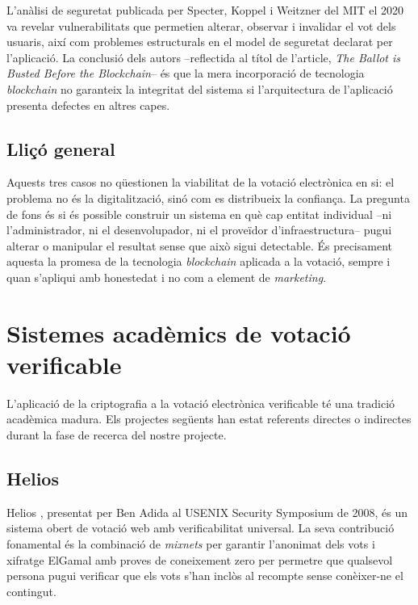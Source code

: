 L'anàlisi de seguretat publicada per Specter, Koppel i Weitzner del
MIT el 2020 \cite{specter2020voatz} va revelar vulnerabilitats que
permetien alterar, observar i invalidar el vot dels usuaris, així com
problemes estructurals en el model de seguretat declarat per
l'aplicació. La conclusió dels autors --reflectida al títol de l'article,
\emph{The Ballot is Busted Before the Blockchain}-- és que la mera
incorporació de tecnologia \emph{blockchain} no garanteix la integritat
del sistema si l'arquitectura de l'aplicació presenta defectes en
altres capes.

\subsection{Lliçó general}

Aquests tres casos no qüestionen la viabilitat de la votació
electrònica en si: el problema no és la digitalització, sinó com es
distribueix la confiança. La pregunta de fons és si és possible
construir un sistema en què cap entitat individual --ni l'administrador,
ni el desenvolupador, ni el proveïdor d'infraestructura-- pugui
alterar o manipular el resultat sense que això sigui detectable. És
precisament aquesta la promesa de la tecnologia \emph{blockchain}
aplicada a la votació, sempre i quan s'apliqui amb honestedat i no
com a element de \emph{marketing}.

\section{Sistemes acadèmics de votació verificable}
\label{sec:sistemes-academics}

L'aplicació de la criptografia a la votació electrònica verificable té
una tradició acadèmica madura. Els projectes següents han estat
referents directes o indirectes durant la fase de recerca del nostre
projecte.

\subsection{Helios}

Helios \cite{adida2008helios}, presentat per Ben Adida al USENIX
Security Symposium de 2008, és un sistema obert de votació web amb
verificabilitat universal. La seva contribució fonamental és la
combinació de \emph{mixnets} per garantir l'anonimat dels vots i
xifratge ElGamal amb proves de coneixement zero per permetre que
qualsevol persona pugui verificar que els vots s'han inclòs al
recompte sense conèixer-ne el contingut.

